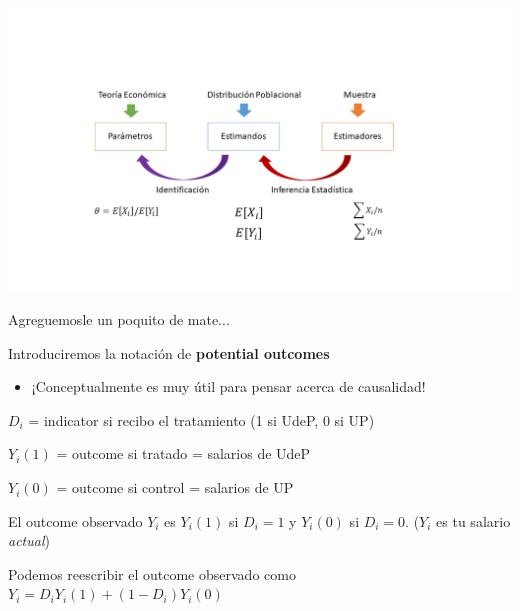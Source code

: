 \documentclass[11pt,handout,aspectratio=169]{beamer}
\newenvironment{wideitemize}{\itemize\addtolength{\itemsep}{10pt}}{\enditemize}
\begin{document}
\begin{frame}
\vspace{-10mm}
	\includegraphics[width=1.2\textwidth]{BigPicture}
\end{frame}


\begin{frame}{Agreguemosle un poquito de mate...}
\begin{wideitemize}
	\item Introduciremos la notación de \textbf{potential outcomes} 
		\begin{itemize}
			\item 
			¡Conceptualmente es muy útil para pensar acerca de causalidad! 
		\end{itemize}
	
	\pause 
	\item $D_i$ = indicator si recibo el tratamiento (1 si UdeP, 0 si UP)
	
	\pause
	\item $Y_i(1)$ = outcome si tratado = salarios de UdeP
	\item $Y_i(0)$ = outcome si control = salarios de UP
	
	\pause 
	\item El outcome observado $Y_i$ es $Y_i(1)$ si $D_i = 1$ y $Y_i(0)$ si $D_i = 0$. ($Y_i$ es tu salario \textit{actual})
	
	\pause
	\item
	Podemos reescribir el outcome observado como $Y_i = D_i Y_i(1) + (1-D_i) Y_i(0)$
\end{wideitemize}

\end{frame}
\end{document}
